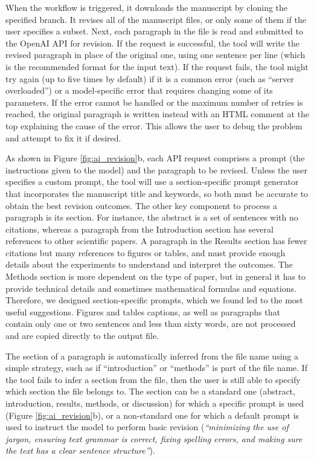 \documentclass[
]{article}
\begin{document}
When the workflow is triggered, it downloads the manuscript by cloning the specified branch.
It revises all of the manuscript files, or only some of them if the user specifies a subset.
Next, each paragraph in the file is read and submitted to the OpenAI API for revision.
If the request is successful, the tool will write the revised paragraph in place of the original one, using one sentence per line (which is the recommended format for the input text).
If the request fails, the tool might try again (up to five times by default) if it is a common error (such as ``server overloaded'') or a model-specific error that requires changing some of its parameters.
If the error cannot be handled or the maximum number of retries is reached, the original paragraph is written instead with an HTML comment at the top explaining the cause of the error.
This allows the user to debug the problem and attempt to fix it if desired.

As shown in Figure \ref{fig:ai_revision}b, each API request comprises a prompt (the instructions given to the model) and the paragraph to be revised.
Unless the user specifies a custom prompt, the tool will use a section-specific prompt generator that incorporates the manuscript title and keywords, so both must be accurate to obtain the best revision outcomes.
The other key component to process a paragraph is its section.
For instance, the abstract is a set of sentences with no citations, whereas a paragraph from the Introduction section has several references to other scientific papers.
A paragraph in the Results section has fewer citations but many references to figures or tables, and must provide enough details about the experiments to understand and interpret the outcomes.
The Methods section is more dependent on the type of paper, but in general it has to provide technical details and sometimes mathematical formulas and equations.
Therefore, we designed section-specific prompts, which we found led to the most useful suggestions.
Figures and tables captions, as well as paragraphs that contain only one or two sentences and less than sixty words, are not processed and are copied directly to the output file.

The section of a paragraph is automatically inferred from the file name using a simple strategy, such as if ``introduction'' or ``methods'' is part of the file name.
If the tool fails to infer a section from the file, then the user is still able to specify which section the file belongs to.
The section can be a standard one (abstract, introduction, results, methods, or discussion) for which a specific prompt is used (Figure \ref{fig:ai_revision}b), or a non-standard one for which a default prompt is used to instruct the model to perform basic revision (\emph{``minimizing the use of jargon, ensuring text grammar is correct, fixing spelling errors, and making sure the text has a clear sentence structure''}).
\end{document}
